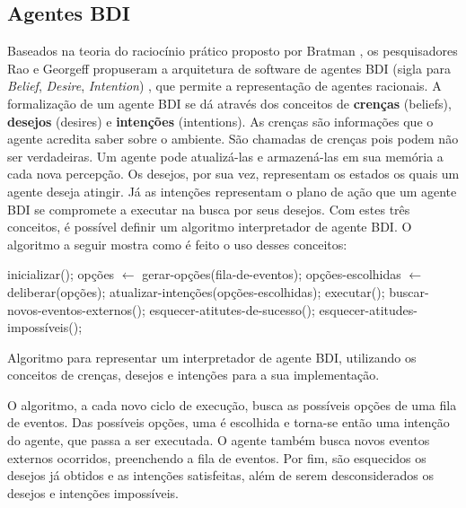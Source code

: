 \subsection{Agentes BDI}
Baseados na teoria do raciocínio prático proposto por Bratman \cite{Bratman87},
os pesquisadores Rao e Georgeff propuseram a arquitetura de software de agentes
BDI (sigla para \textit{Belief}, \textit{Desire}, \textit{Intention})
\cite{bdi-icmas95}, que permite a representação de agentes racionais. A
formalização de um agente BDI se dá através dos conceitos de \textbf{crenças}
(beliefs), \textbf{desejos} (desires) e \textbf{intenções} (intentions). As
crenças são informações que o agente acredita saber sobre o ambiente.  São
chamadas de crenças pois podem não ser verdadeiras. Um agente pode atualizá-las
e armazená-las em sua memória a cada nova percepção. Os desejos, por sua vez,
representam os estados os quais um agente deseja atingir. Já as intenções
representam o plano de ação que um agente BDI se compromete a executar na busca
por seus desejos. Com estes três conceitos, é possível definir um algoritmo
interpretador de agente BDI. O algoritmo a seguir mostra como é feito o uso
desses conceitos:

\begin{algorithm}[htb]
\begin{center}
	\begin{algorithmic}[1]
        \STATE inicializar();
        \STATE {}
            \STATE opções $\gets$ gerar-opções(fila-de-eventos);
            \STATE opções-escolhidas $\gets$ deliberar(opções);
            \STATE atualizar-intenções(opções-escolhidas);
            \STATE executar();
            \STATE buscar-novos-eventos-externos();
            \STATE esquecer-atitutes-de-sucesso();
            \STATE esquecer-atitudes-impossíveis();
        \ENDWHILE
    \end{algorithmic}
\end{center}
\caption[Algoritmo para representar um interpretador de agente BDI.]
{\label{alg:BDIINTERPRETERALG} Algoritmo para representar um interpretador de
agente BDI, utilizando os conceitos de crenças, desejos e intenções para a sua
implementação.}
\end{algorithm}

O algoritmo, a cada novo ciclo de execução, busca as possíveis opções de uma
fila de eventos. Das possíveis opções, uma é escolhida e torna-se então uma
intenção do agente, que passa a ser executada. O agente também busca novos
eventos externos ocorridos, preenchendo a fila de eventos. Por fim, são
esquecidos os desejos já obtidos e as intenções satisfeitas, além de serem
desconsiderados os desejos e intenções impossíveis.

